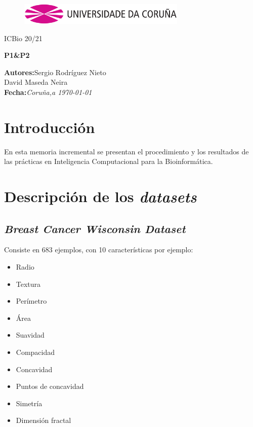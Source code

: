 \documentclass[a4paper,openwrite,12pt]{article}
\begin{document}
\begin{titlepage}

\begin{center}
\vspace*{-1in}
\begin{figure}[htb]
\begin{center}
\includegraphics[width=8cm]{img/udc.png}
\end{center}
\end{figure}

\vspace*{1in}
ICBio 20/21 \\
\vspace*{1in}
\begin{Large}
\textbf{P1\&P2} \\
\end{Large}

\vspace*{3in}

\begin{large}
\raggedleft
\textbf{Autores:}Sergio Rodríguez Nieto \\
David Maseda Neira \\
\textbf{Fecha:}\textit{Coruña,a \today}\\
\end{large}

\end{center}
\end{titlepage} 
\tableofcontents
{}
\newpage
\section{Introducción}
En esta memoria incremental se presentan el procedimiento y los resultados de las prácticas en Inteligencia Computacional para la Bioinformática.

\section{Descripción de los \textit{datasets}}
\subsection{\textit{Breast Cancer Wisconsin Dataset}}
Consiste en  683 ejemplos, con 10 características por ejemplo:
\begin{itemize}
    \item Radio
    \item Textura
    \item Perímetro
    \item Área
    \item Suavidad
    \item Compacidad
    \item Concavidad
    \item Puntos de concavidad
    \item Simetría
    \item Dimensión fractal
\end{itemize}
\end{document}
